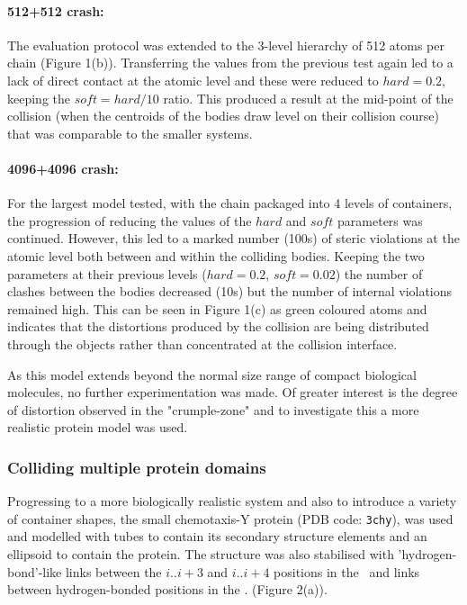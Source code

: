 \paragraph{512+512 crash:\\}

The evaluation protocol was extended to the 3-level hierarchy of 512 atoms per chain (Figure 1(b)).
Transferring the values from the previous test again led to a lack of direct contact at the
atomic level and these were reduced to $hard = 0.2$, keeping the $soft = hard/10$ ratio.
This produced a result at the mid-point of the collision (when the centroids of the bodies
draw level on their collision course) that was comparable to the smaller systems.

\paragraph{4096+4096 crash:\\}

For the largest model tested, with the chain packaged into 4 levels of containers,  the
progression of reducing the values of the $hard$ and $soft$ parameters was continued.
However, this led to a marked number (100s) of steric violations at the atomic level both
between and within the colliding bodies.   Keeping the two parameters at their previous
levels ($hard = 0.2$, $soft = 0.02$) the number of clashes between the bodies decreased
(10s) but the number of internal violations remained high.   This can be seen in Figure 1(c)
as green coloured atoms and indicates that the distortions produced by the collision are
being distributed through the objects rather than concentrated at the collision interface.

As this model extends beyond the normal size range of compact biological molecules,
no further experimentation was made.   Of greater interest is the degree of distortion 
observed in the "crumple-zone" and to investigate this a more realistic protein model
was used.


\subsubsection{Colliding multiple protein domains}

Progressing to a more biologically realistic system and also to introduce a variety
of container shapes, the small chemotaxis-Y protein (PDB code: {\tt 3chy}), was used
and modelled with tubes to contain its secondary structure elements and an ellipsoid
to contain the protein.    The structure was also stabilised with 'hydrogen-bond'-like
links between the $i..i+3$ and $i..i+4$ positions in the \AHs\ and links between
hydrogen-bonded positions in the \BS. (Figure 2(a)).

